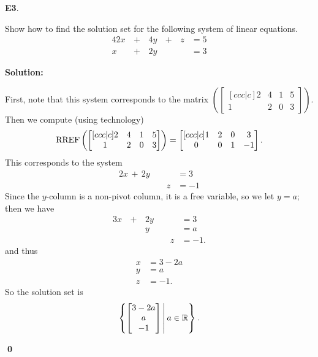 \documentclass{article}
\newenvironment{problem}[1]
{
  \begin{flushleft}
  \textbf{#1}.
  \ignorespaces
}
{
  \end{flushleft}
}
\newenvironment{solution}
{
  \ignorespaces
  \textbf{Solution:}
}
{
  \ignorespacesafterend
  \begin{flushright}
  {\bfseries \qed}
  \end{flushright}
}
\begin{document}
\begin{problem}{E3}
Show how to find the solution set for the following system of linear equations.
\begin{alignat*}{4}
2x&\,+\,&4y&\,+\,&z &= 5 \\
x&\,+\,&2y &\,\,& &= 3
\end{alignat*}
\end{problem}
\begin{solution}
First, note that this system corresponds to the matrix 
\( \left( \begin{bmatrix}[ccc|c] 2 & 4 & 1 & 5 \\ 1 & 2 & 0 & 3 \end{bmatrix} \right)\).
Then we compute (using technology) 
\[
  \operatorname{RREF} \left(
    \begin{bmatrix}[ccc|c] 2 & 4 & 1 & 5 \\ 1 & 2 & 0 & 3 \end{bmatrix}
  \right)
    =
  \begin{bmatrix}[ccc|c] 1 & 2 & 0 & 3 \\ 0 & 0 & 1 & -1\end{bmatrix}.
\]
This corresponds to the system
\begin{alignat*}{2}
x\,+\,2y&\,\,&  &= 3 \\
  &\,\,& z&= -1
\end{alignat*}
Since the \(y\)-column is a non-pivot column, it is a free variable, so we let \(y=a\); then we have
\begin{alignat*}{3}
x&\,+\,&2y&\,\,&  &= 3 \\
 &\,\,&y &\,\,& &=a \\
 &\,\,& &\,\,& z&= -1.
\end{alignat*}
and thus
\begin{align*}
x&= 3-2a \\
y&= a \\
z&= -1.
\end{align*}
So the solution set is
\[
  \left\{
    \begin{bmatrix} 3-2a \\ a \\ -1 \end{bmatrix}
  \,\middle|\,
    a \in \mathbb{R}
  \right\}.
\]
\end{solution}
\end{document}
